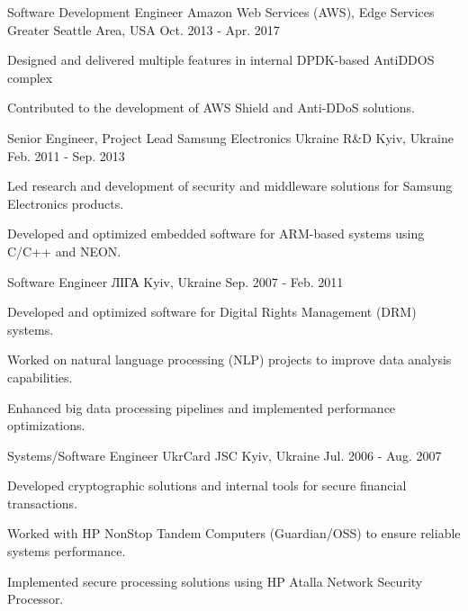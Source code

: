 \begin{cventries}
\cventry
  {Software Development Engineer} %
  {Amazon Web Services (AWS), Edge Services} %
  {Greater Seattle Area, USA} %
  {Oct. 2013 - Apr. 2017} %
  {
    \begin{cvitems} %
      \item {Designed and delivered multiple features in internal DPDK-based AntiDDOS complex}
      \item {Contributed to the development of AWS Shield and Anti-DDoS solutions.}
    \end{cvitems}
  }

\cventry
  {Senior Engineer, Project Lead} %
  {Samsung Electronics Ukraine R\&D} %
  {Kyiv, Ukraine} %
  {Feb. 2011 - Sep. 2013} %
  {
    \begin{cvitems} %
      \item {Led research and development of security and middleware solutions for Samsung Electronics products.}
      \item {Developed and optimized embedded software for ARM-based systems using C/C++ and NEON.}
    \end{cvitems}
  }

\cventry
  {Software Engineer} %
  {ЛІГА} %
  {Kyiv, Ukraine} %
  {Sep. 2007 - Feb. 2011} %
  {
    \begin{cvitems} %
      \item {Developed and optimized software for Digital Rights Management (DRM) systems.}
      \item {Worked on natural language processing (NLP) projects to improve data analysis capabilities.}
      \item {Enhanced big data processing pipelines and implemented performance optimizations.}
    \end{cvitems}
  }

\cventry
  {Systems/Software Engineer} %
  {UkrCard JSC} %
  {Kyiv, Ukraine} %
  {Jul. 2006 - Aug. 2007} %
  {
    \begin{cvitems} %
      \item {Developed cryptographic solutions and internal tools for secure financial transactions.}
      \item {Worked with HP NonStop Tandem Computers (Guardian/OSS) to ensure reliable systems performance.}
      \item {Implemented secure processing solutions using HP Atalla Network Security Processor.}
    \end{cvitems}
  }


\end{cventries}
